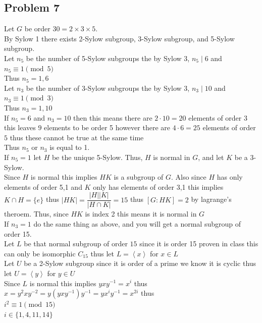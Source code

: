 \documentclass[12pt, letterpaper]{article}
\theoremstyle{definition}
\newcommand{\ang}[1]{\left\langle #1 \right\rangle}
\begin{document}
\subsection*{Problem 7}
Let $G$ be order $30=2\times3\times5$.\\
By Sylow 1 there exists 2-Sylow subgroup, 3-Sylow subgroup, and 5-Sylow subgroup.\\
Let $n_5$ be the number of 5-Sylow subgroups the by Sylow 3, $n_5 \mid 6$ and $n_5 \equiv 1 \pmod{5}$\\
Thus $n_5=1,6$\\
Let $n_3$ be the number of 3-Sylow subgroups the by Sylow 3, $n_3 \mid 10$ and $n_3 \equiv 1 \pmod{3}$\\
Thus $n_3=1,10$\\
If $n_5=6$ and $n_3=10$ then this means there are $2\cdot 10=20$ elements of order $3$\\ 
this leaves $9$ elements to be order 5 however there are $4 \cdot 6=25$ elements of order $5$ thus these cannot be true at the same time\\
Thus $n_5$ or $n_3$ is equal to 1.\\
If $n_5=1$ let $H$ be the unique 5-Sylow. Thus, $H$ is normal in $G$, and let $K$ be a 3-Sylow.\\
Since $H$ is normal this implies $HK$ is a subgroup of $G$. Also since $H$ has only elements of order 5,1 and $K$ only has elements of order 3,1 this implies $K\cap H = \{e\}$
thus $|HK|=\dfrac{|H||K|}{|H \cap K|}=15$ thus $[G : HK]=2$ by lagrange's theroem. Thus, since $HK$ is index 2 this means it is normal in $G$\\
If $n_3=1$ do the same thing as above, and you will get a normal subgroup of order 15.\\
Let $L$ be that normal subgroup of order $15$ since it is order 15 proven in class this can only be isomorphic $C_{15}$ thus let $L=\ang{x}$ for $x\in L$\\
Let $U$ be a 2-Sylow subgroup since it is order of a prime we know it is cyclic thus let $U=\ang{y}$ for $y \in U$\\
Since $L$ is normal this implies $yxy^{-1}=x^i$ thus\\
$x=y^2xy^{-2}=y(yxy^{-1})y^{-1}=yx^iy^{-1}=x^{2i}$ thus\\
$i^2 \equiv 1 \pmod{15}$\\
$i \in \{1,4,11,14\}$\\
\end{document}
